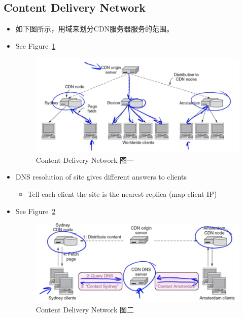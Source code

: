 \documentclass[12pt]{ctexart}   %
\begin{document}
	\subsection{Content Delivery Network}
	\begin{itemize}
		\item 如下图所示，用域来划分CDN服务器服务的范围。
		\item See Figure~\ref{fig:8-7-5}
		  
		 \begin{figure}[h!] %
		\centering
		 \includegraphics[scale=0.7]{images/8-7-5}
		\caption{ Content Delivery Network 图一}
		 \label{fig:8-7-5}
		 \end{figure}
		 
		 \item DNS resolution of site gives different answers to clients
		 \begin{itemize}
		 	\item Tell each client the site is the nearest replica (map client IP)
		 \end{itemize}
		 \item See Figure~\ref{fig:8-7-6}
		  
		 \begin{figure}[h!] %
		\centering
		 \includegraphics[scale=0.7]{images/8-7-6}
		\caption{ Content Delivery Network 图二 }
		 \label{fig:8-7-6}
		 \end{figure}
	\end{itemize}
	
\end{document}
